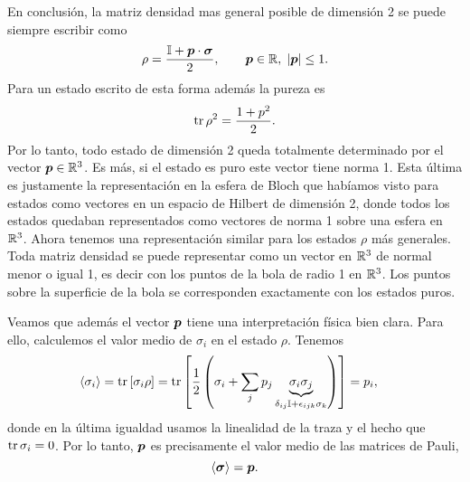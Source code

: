 \documentclass[10pt, a4paper]{article}
\numberwithin{equation}{subsection}
\begin{document}
En conclusión, la matriz densidad mas general posible de dimensión 2 se puede
siempre escribir como
\begin{equation}
  \rho = \frac{\mathbb{I} + \vb*{p}\cdot\vb*{\sigma}}{2}, \qquad \vb*{p}\in\mathbb{R},
  \; \abs{\vb*{p}} \leq 1.
\end{equation}
Para un estado escrito de esta forma además la pureza es
\begin{equation}
  \tr\rho^2 = \frac{1 + p^2}{2}.
\end{equation}
Por lo tanto, todo estado de dimensión 2 queda totalmente determinado por el
vector $\vb*{p} \in \mathbb{R}^3$. Es más, si el estado es puro este vector tiene
norma 1. Esta última es justamente la representación en la esfera de Bloch que
habíamos visto para estados como vectores en un espacio de Hilbert de dimensión
2, donde todos los estados quedaban representados como vectores de norma 1
sobre una esfera en $\mathbb{R}^3$. Ahora tenemos una representación similar para
los estados $\rho$ más generales. Toda matriz densidad se puede representar
como un vector en $\mathbb{R}^3$ de normal menor o igual 1, es decir con los puntos
de la bola de radio 1 en $\mathbb{R}^3$. Los puntos sobre la superficie de la bola
se corresponden exactamente con los estados puros.

Veamos que además el vector $\vb*{p}$ tiene una interpretación física bien
clara. Para ello, calculemos el valor medio de $\sigma_i$ en el estado $\rho$.
Tenemos
\begin{align}
  \expval{\sigma_i}
  &= \tr\left[\sigma_i\rho\right]
  = \tr\left[\frac{1}{2}\left(\sigma_i +
    \sum_jp_j\underbrace{\sigma_i\sigma_j}_{\delta_{ij}\mathbb{I} +
    \epsilon_{ijk}\sigma_k}\right)\right]
  = p_i,
\end{align}
donde en la última igualdad usamos la linealidad de la traza y el hecho que
$\tr\sigma_i = 0$. Por lo tanto, $\vb*{p}$ es precisamente el valor medio de
las matrices de Pauli,
\begin{equation}
  \expval{\vb*{\sigma}} = \vb*{p}.
\end{equation}
\end{document}
